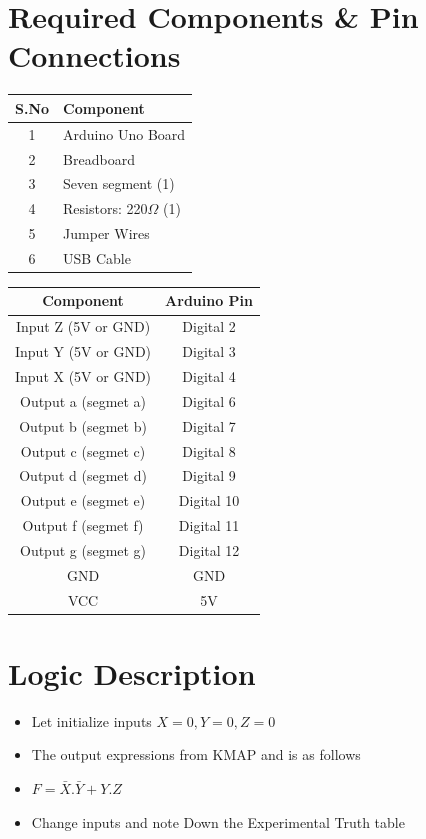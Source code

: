 \documentclass[a4paper,12pt]{article}
\begin{document}
\section*{Required Components \& Pin Connections}
\begin{center}
\begin{minipage}{0.45\textwidth}
\begin{table}[H]
\centering
\begin{tabular}{|c|l|}
\hline
\textbf{S.No} & \textbf{Component} \\ \hline
1 & Arduino Uno Board \\
2 & Breadboard \\
3 & Seven segment (1) \\
4 & Resistors: 220$\Omega$ (1) \\
5 & Jumper Wires \\
6 & USB Cable \\
\hline
\end{tabular}
\end{table}
\end{minipage}
\hspace{0.05\textwidth}
\begin{minipage}{0.45\textwidth}
\begin{table}[H]
\centering
\begin{tabular}{|c|c|}
\hline
\textbf{Component} & \textbf{Arduino Pin} \\ \hline
Input Z (5V or GND) & Digital 2 \\
Input Y (5V or GND) & Digital 3 \\
Input X (5V or GND) & Digital 4 \\
Output a (segmet a) & Digital 6 \\
Output b (segmet b) & Digital 7 \\
Output c (segmet c) & Digital 8 \\
Output d (segmet d) & Digital 9 \\
Output e (segmet e) & Digital 10 \\
Output f (segmet f) & Digital 11 \\
Output g (segmet g) & Digital 12 \\
GND & GND \\
VCC & 5V \\
\hline
\end{tabular}
\end{table}
\end{minipage}
\end{center}
\section*{Logic Description}
\begin{itemize}
        \item Let initialize inputs $X=0,Y=0,Z=0$
        \item The output expressions from KMAP and is as follows
	\item $F=\bar{X}.\bar{Y}+Y.Z$
	\item Change inputs and note Down the Experimental Truth table
\end{itemize}
\end{document}
